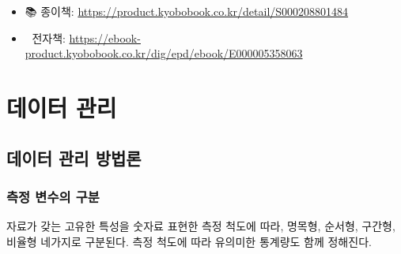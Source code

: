 \documentclass[
  letterpaper,
  chapter,a4paper,showtrims,openright,hidelinks]{oblivoir}
\providecommand{\tightlist}{%
  \setlength{\itemsep}{0pt}\setlength{\parskip}{0pt}}\usepackage{longtable,booktabs,array}
\begin{document}
\begin{itemize}
\tightlist
\item
  📚 종이책: \url{https://product.kyobobook.co.kr/detail/S000208801484}
\item
  📱 전자책:
  \url{https://ebook-product.kyobobook.co.kr/dig/epd/ebook/E000005358063}
\end{itemize}

\part{데이터 관리}

\hypertarget{uxb370uxc774uxd130-uxad00uxb9ac-uxbc29uxbc95uxb860}{%
\chapter{데이터 관리
방법론}\label{uxb370uxc774uxd130-uxad00uxb9ac-uxbc29uxbc95uxb860}}

\hypertarget{uxce21uxc815-uxbcc0uxc218uxc758-uxad6cuxbd84}{%
\section{측정 변수의
구분}\label{uxce21uxc815-uxbcc0uxc218uxc758-uxad6cuxbd84}}

자료가 갖는 고유한 특성을 숫자료 표현한 측정 척도에 따라, 명목형,
순서형, 구간형, 비율형 네가지로 구분된다. 측정 척도에 따라 유의미한
통계량도 함께 정해진다. \autocite{wiener1921new}
\autocite{lee2020godeung,stevens1946theory}
\end{document}
